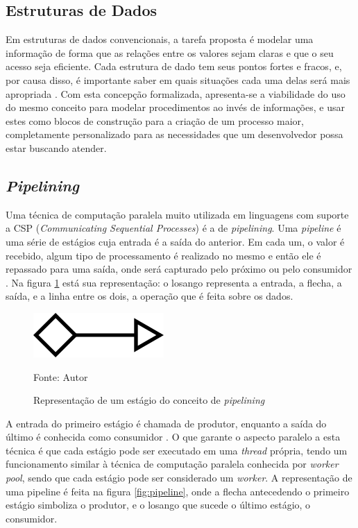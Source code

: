 \documentclass[12pt]{article}
\begin{document}
  \subsection{Estruturas de Dados}
  
  Em estruturas de dados convencionais, a tarefa proposta é modelar uma informação de forma que as relações entre os valores sejam claras e que o seu acesso seja eficiente. Cada estrutura de dado tem seus pontos fortes e fracos, e, por causa disso, é importante saber em quais situações cada uma delas será mais apropriada \cite{cormen2009}. Com esta concepção formalizada, apresenta-se a viabilidade do uso do mesmo conceito para modelar procedimentos ao invés de informações, e usar estes como blocos de construção para a criação de um processo maior, completamente personalizado para as necessidades que um desenvolvedor possa estar buscando atender.
  
  \subsection{\textit{Pipelining}}
  
  Uma técnica de computação paralela muito utilizada em linguagens com suporte a CSP (\textit{Communicating Sequential Processes}) é a de \textit{pipelining}. Uma \textit{pipeline} é uma série de estágios cuja entrada é a saída do anterior. Em cada um, o valor é recebido, algum tipo de processamento é realizado no mesmo e então ele é repassado para uma saída, onde será capturado pelo próximo ou pelo consumidor \cite{ajmani2014}. Na figura \ref{fig:stage} está sua representação: o losango representa a entrada, a flecha, a saída, e a linha entre os dois, a operação que é feita sobre os dados.
  
  \begin{figure}[ht]
    \centering
    \includegraphics[width=.2\textwidth]{img/stage.png}
    \caption{Representação de um estágio do conceito de \textit{pipelining}}
    Fonte: Autor
    \label{fig:stage}
  \end{figure}
  
  A entrada do primeiro estágio é chamada de produtor, enquanto a saída do último é conhecida como consumidor \cite{ajmani2014}. O que garante o aspecto paralelo a esta técnica é que cada estágio pode ser executado em uma \textit{thread} própria, tendo um funcionamento similar à técnica de computação paralela conhecida por \textit{worker pool}, sendo que cada estágio pode ser considerado um \textit{worker}. A representação de uma pipeline é feita na figura \ref{fig:pipeline}, onde a flecha antecedendo o primeiro estágio simboliza o produtor, e o losango que sucede o último estágio, o consumidor.
  
\end{document}
